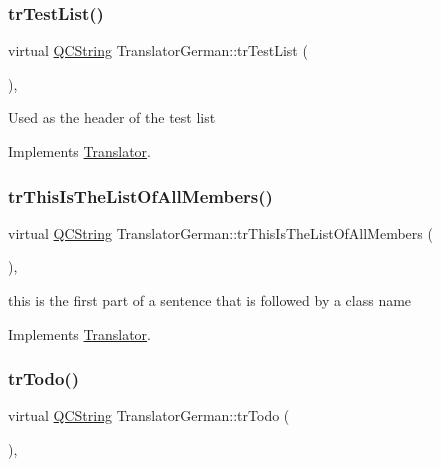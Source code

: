\subsubsection{\texorpdfstring{trTestList()}{trTestList()}}
{\footnotesize\ttfamily virtual \mbox{\hyperlink{class_q_c_string}{Q\+C\+String}} Translator\+German\+::tr\+Test\+List (\begin{DoxyParamCaption}{ }\end{DoxyParamCaption})\hspace{0.3cm}{\ttfamily [inline]}, {\ttfamily [virtual]}}

Used as the header of the test list 

Implements \mbox{\hyperlink{class_translator}{Translator}}.

\mbox{\label{class_translator_german_ab9c97d53948e1dff29ed524a3efa0e55}} 
\subsubsection{\texorpdfstring{trThisIsTheListOfAllMembers()}{trThisIsTheListOfAllMembers()}}
{\footnotesize\ttfamily virtual \mbox{\hyperlink{class_q_c_string}{Q\+C\+String}} Translator\+German\+::tr\+This\+Is\+The\+List\+Of\+All\+Members (\begin{DoxyParamCaption}{ }\end{DoxyParamCaption})\hspace{0.3cm}{\ttfamily [inline]}, {\ttfamily [virtual]}}

this is the first part of a sentence that is followed by a class name 

Implements \mbox{\hyperlink{class_translator}{Translator}}.

\mbox{\label{class_translator_german_a03f24526d67120cac7c289d511e9ff6e}} 
\subsubsection{\texorpdfstring{trTodo()}{trTodo()}}
{\footnotesize\ttfamily virtual \mbox{\hyperlink{class_q_c_string}{Q\+C\+String}} Translator\+German\+::tr\+Todo (\begin{DoxyParamCaption}{ }\end{DoxyParamCaption})\hspace{0.3cm}{\ttfamily [inline]}, {\ttfamily [virtual]}}

